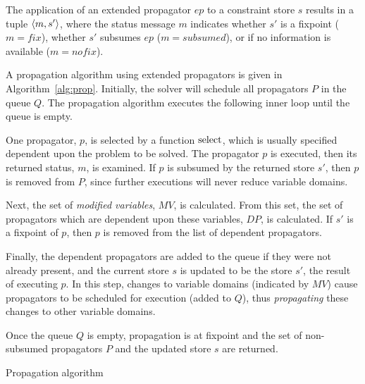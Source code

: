 The application of an extended propagator $ep$ to a constraint store $s$
results in a tuple 
$\left\langle m,s'\right\rangle$, where the status message $m$ indicates 
whether $s'$ is a fixpoint ($m = \mathit{fix}$), 
whether $s'$ subsumes $ep$ ($m = \mathit{subsumed}$), 
or if no information is available ($m = \mathit{nofix}$).

A propagation algorithm using extended propagators is given in Algorithm~\ref{alg:prop}.
Initially, the solver will schedule all propagators $P$ in the queue $Q$. The propagation algorithm executes the following inner loop until the queue is empty.

One propagator, $p$, is selected by a function $\operatorname{select}$, which is usually specified dependent upon the problem to be solved. The propagator $p$ is executed, then its returned status, $m$, is examined. If $p$ is subsumed by the returned store $s'$, then $p$ is removed from $P$, since further executions will never reduce variable domains.

Next, the set of \textit{modified variables}, $\mathit{MV}$, is calculated. From this set, the set of propagators which are dependent upon these variables, $\mathit{DP}$, is calculated. If $s'$ is a fixpoint of $p$, then $p$ is removed from the list of dependent propagators. 

Finally, the dependent propagators are added to the queue if they were not already present, and the current store $s$ is updated to be the store $s'$, the result of executing $p$. In this step, changes to variable domains (indicated by $\mathit{MV}$) cause propagators to be scheduled for execution (added to $Q$), thus \textit{propagating} these changes to other variable domains.

Once the queue $Q$ is empty, propagation is at fixpoint and the set of non-subsumed propagators $P$ and the updated store $s$ are returned.
\begin{algorithm}
    \caption{Propagation algorithm}
    \label{alg:prop}
    \begin{algorithmic}
                \EndIf
                \EndIf
            \EndWhile
        \EndFunction
    \end{algorithmic}
\end{algorithm}


